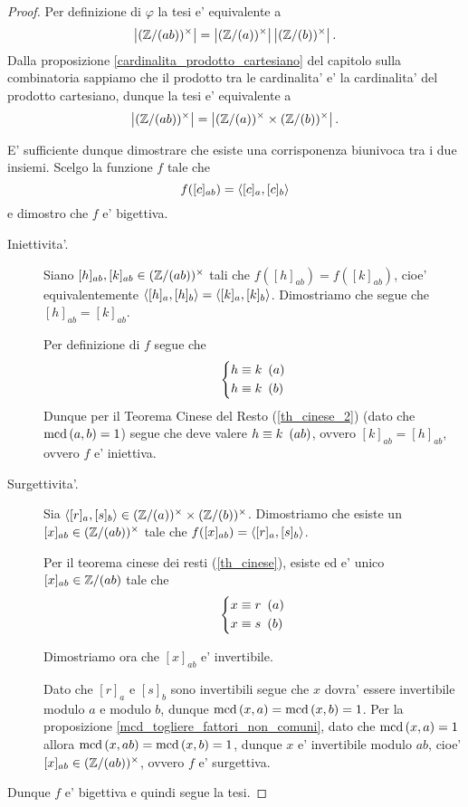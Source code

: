 \begin{proof}
    Per definizione di $\varphi$ la tesi e' equivalente a \[
        \left|(\mathbb{Z}/(ab))^{\times}\right| = \left|(\mathbb{Z}/(a))^{\times}\right|\left|(\mathbb{Z}/(b))^{\times}\right|.
    \]
    Dalla proposizione \ref{cardinalita_prodotto_cartesiano} del capitolo sulla combinatoria sappiamo che il prodotto tra le cardinalita' e' la cardinalita' del prodotto cartesiano, dunque la tesi e' equivalente a \[
        \left|(\mathbb{Z}/(ab))^{\times}\right| = \left|(\mathbb{Z}/(a))^{\times}\times(\mathbb{Z}/(b))^{\times}\right|.
    \]

    E' sufficiente dunque dimostrare che esiste una corrisponenza biunivoca tra i due insiemi. Scelgo la funzione $f$ tale che \[
        f([c]_{ab}) = \left\langle [c]_a, [c]_b \right\rangle    
    \] e dimostro che $f$ e' bigettiva.

    \begin{description}
        \item[Iniettivita'.] Siano $[h]_{ab}, [k]_{ab} \in (\mathbb{Z}/(ab))^{\times}$ tali che $f([h]_{ab}) = f([k]_{ab})$, cioe' equivalentemente $\left\langle [h]_a, [h]_b \right\rangle = \left\langle [k]_a, [k]_b \right\rangle$. Dimostriamo che segue che $[h]_{ab} = [k]_{ab}$.
        
        Per definizione di $f$ segue che \[
            \left\{
            \begin{alignedat}{1}
                &h \equiv k \ \left(a\right)\\
                &h \equiv k \ \left(b\right)
            \end{alignedat}
            \right.   
        \] Dunque per il Teorema Cinese del Resto (\ref{th_cinese_2}) (dato che $\operatorname{mcd}\left(a, b\right) = 1$) segue che deve valere $h \equiv k \ \left(ab\right)$, ovvero $[k]_{ab} = [h]_{ab}$, ovvero $f$ e' iniettiva.
        \item[Surgettivita'.] Sia $\left\langle [r]_a, [s]_b \right\rangle \in (\mathbb{Z}/(a))^{\times}\times(\mathbb{Z}/(b))^{\times}$. Dimostriamo che esiste un $[x]_{ab} \in (\mathbb{Z}/(ab))^{\times}$ tale che $f([x]_{ab}) = \left\langle [r]_a, [s]_b \right\rangle$.
        
        Per il teorema cinese dei resti (\ref{th_cinese}), esiste ed e' unico $[x]_{ab} \in \mathbb{Z}/(ab)$ tale che \[
            \left\{
            \begin{alignedat}{1}
                &x \equiv r \ \left(a\right)\\
                &x \equiv s \ \left(b\right)
            \end{alignedat}
            \right.   
        \] 
        
        Dimostriamo ora che $[x]_{ab}$ e' invertibile.
                
        Dato che $[r]_a$ e $[s]_b$ sono invertibili segue che $x$ dovra' essere invertibile modulo $a$ e modulo $b$, dunque $\operatorname{mcd}\left(x, a\right) = \operatorname{mcd}\left(x, b\right) = 1$. Per la proposizione \ref{mcd_togliere_fattori_non_comuni}, dato che $\operatorname{mcd}\left(x, a\right) = 1$ allora $\operatorname{mcd}\left(x, ab\right) = \operatorname{mcd}\left(x, b\right) = 1$, dunque $x$ e' invertibile modulo $ab$, cioe' $[x]_{ab} \in (\mathbb{Z}/(ab))^{\times}$, ovvero $f$ e' surgettiva.
    \end{description}

    Dunque $f$ e' bigettiva e quindi segue la tesi.
\end{proof}

